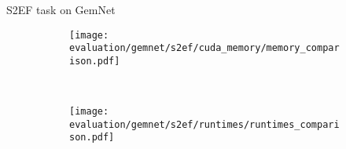 \begin{frame}{S2EF task on GemNet}
    
    \begin{figure}[H]
        \centering
    
        \begin{subfigure}[t]{0.48\textwidth}
            \centering
            \texttt{[image: evaluation/gemnet/s2ef/cuda\_memory/memory\_comparison.pdf]}
        \end{subfigure}%
        ~
        \begin{subfigure}[t]{0.48\textwidth}
            \centering
            \texttt{[image: evaluation/gemnet/s2ef/runtimes/runtimes\_comparison.pdf]}
        \end{subfigure}

        \vspace*{-0.5em}
    

\end{figure}
\end{frame}
